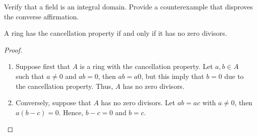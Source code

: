 \documentclass[11pt,a4paper]{article}
\begin{document}
\begin{eje}
    Verify that a  field is an integral domain.
    Provide a counterexample that disproves the converse affirmation.
\end{eje}

\begin{prop} 
A ring has the  cancellation property if and only if it has no zero divisors.
\end{prop} 

\begin{proof}
\begin{enumerate}[label=(\roman*)]
\item Suppose first that $A$ is a ring with the cancellation property. Let $a,b\in A$ such that $a\neq 0$ and $ab=0$, then $ab=a0$, but this imply that $b=0$ due to the cancellation property. Thus, $A$ has no zero divisors.
\item Conversely, suppose that $A$ has no zero divisors. Let $ab=ac$ with $a\neq0$, then $a(b-c)=0$. Hence, $b-c=0$ and $b=c$.
\end{enumerate}
\end{proof}
  
\end{document}
